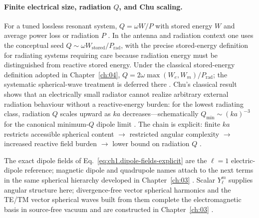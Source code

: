 \paragraph{Finite electrical size, radiation $Q$, and Chu scaling.}
For a tuned lossless resonant system, $Q=\omega W/P$ with stored energy $W$ and average power loss or radiation $P$ \cite{stratton1941,chu1948}. In the antenna and radiation context one uses the conceptual seed $Q\sim\omega W_{\mathrm{stored}}/P_{\mathrm{rad}}$, with the precise stored-energy definition for radiating systems requiring care because radiation energy must be distinguished from reactive stored energy. Under the classical stored-energy definition adopted in Chapter~\ref{ch:04}, $Q=2\omega\max(W_e,W_m)/P_{\mathrm{rad}}$; the systematic spherical-wave treatment is deferred there \cite{chu1948,harrington2001}. Chu's classical result \cite{chu1948} shows that an electrically small radiator cannot realize arbitrary external radiation behaviour without a reactive-energy burden: for the lowest radiating class, radiation $Q$ scales upward as $ka$ decreases---schematically $Q_{\min}\sim (ka)^{-3}$ for the canonical minimum-$Q$ dipole limit \cite{chu1948,harrington2001}. The chain is explicit: finite $ka$ restricts accessible spherical content $\rightarrow$ restricted angular complexity $\rightarrow$ increased reactive field burden $\rightarrow$ lower bound on radiation $Q$ \cite{chu1948,stratton1941}.


The exact dipole fields of Eq.~\eqref{eq:ch1.dipole-fields-explicit} are the $\ell=1$ electric-dipole reference; magnetic dipole and quadrupole names attach to the next terms in the same spherical hierarchy developed in Chapter~\ref{ch:03} \cite{stratton1941,tai1994}. Scalar $Y_\ell^m$ supplies angular structure here; divergence-free vector spherical harmonics and the TE/TM vector spherical waves built from them complete the electromagnetic basis in source-free vacuum and are constructed in Chapter~\ref{ch:03} \cite{hansen1988,stratton1941}.
